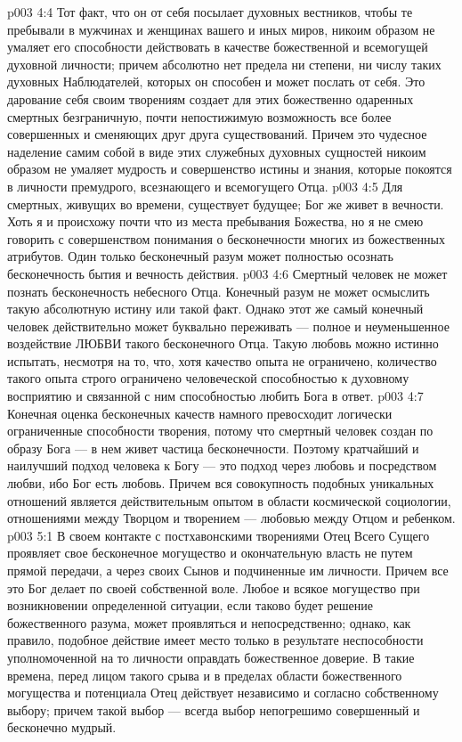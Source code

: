 \vs p003 4:4 Тот факт, что он от себя посылает духовных вестников, чтобы те пребывали в мужчинах и женщинах вашего и иных миров, никоим образом не умаляет его способности действовать в качестве божественной и всемогущей духовной личности; причем абсолютно нет предела ни степени, ни числу таких духовных Наблюдателей, которых он способен и может послать от себя. Это дарование себя своим творениям создает для этих божественно одаренных смертных безграничную, почти непостижимую возможность все более совершенных и сменяющих друг друга существований. Причем это чудесное наделение самим собой в виде этих служебных духовных сущностей никоим образом не умаляет мудрость и совершенство истины и знания, которые покоятся в личности премудрого, всезнающего и всемогущего Отца.
\vs p003 4:5 \pc Для смертных, живущих во времени, существует будущее; Бог же живет в вечности. Хоть я и происхожу почти что из места пребывания Божества, но я не смею говорить с совершенством понимания о бесконечности многих из божественных атрибутов. Один только бесконечный разум может полностью осознать бесконечность бытия и вечность действия.
\vs p003 4:6 \pc Смертный человек не может познать бесконечность небесного Отца. Конечный разум не может осмыслить такую абсолютную истину или такой факт. Однако этот же самый конечный человек действительно может  буквально переживать --- полное и неуменьшенное воздействие ЛЮБВИ такого бесконечного Отца. Такую любовь можно истинно испытать, несмотря на то, что, хотя качество опыта не ограничено, количество такого опыта строго ограничено человеческой способностью к духовному восприятию и связанной с ним способностью любить Бога в ответ.
\vs p003 4:7 Конечная оценка бесконечных качеств намного превосходит логически ограниченные способности творения, потому что смертный человек создан по образу Бога --- в нем живет частица бесконечности. Поэтому кратчайший и наилучший подход человека к Богу --- это подход через любовь и посредством любви, ибо Бог есть любовь. Причем вся совокупность подобных уникальных отношений является действительным опытом в области космической социологии, отношениями между Творцом и творением --- любовью между Отцом и ребенком.
\vs p003 5:1 В своем контакте с постхавонскими творениями Отец Всего Сущего проявляет свое бесконечное могущество и окончательную власть не путем прямой передачи, а через своих Сынов и подчиненные им личности. Причем все это Бог делает по своей собственной воле. Любое и всякое могущество при возникновении определенной ситуации, если таково будет решение божественного разума, может проявляться и непосредственно; однако, как правило, подобное действие имеет место только в результате неспособности уполномоченной на то личности оправдать божественное доверие. В такие времена, перед лицом такого срыва и в пределах области божественного могущества и потенциала Отец действует независимо и согласно собственному выбору; причем такой выбор --- всегда выбор непогрешимо совершенный и бесконечно мудрый.
